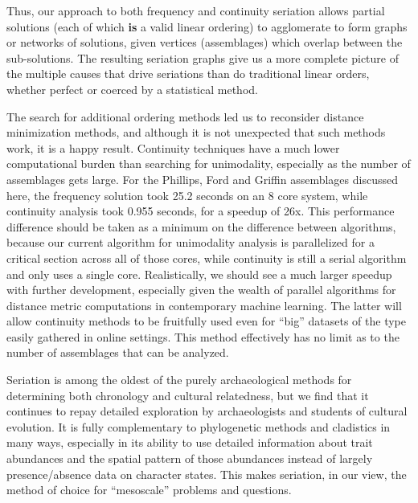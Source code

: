 Thus, our approach to both frequency and continuity seriation allows
partial solutions (each of which \textbf{is} a valid linear ordering) to
agglomerate to form graphs or networks of solutions, given vertices
(assemblages) which overlap between the sub-solutions. The resulting
seriation graphs give us a more complete picture of the multiple causes
that drive seriations than do traditional linear orders, whether perfect
or coerced by a statistical method.

The search for additional ordering methods led us to reconsider distance
minimization methods, and although it is not unexpected that such
methods work, it is a happy result. Continuity techniques have a much
lower computational burden than searching for unimodality, especially as
the number of assemblages gets large. For the Phillips, Ford and Griffin
assemblages discussed here, the frequency solution took 25.2 seconds on
an 8 core system, while continuity analysis took 0.955 seconds, for a
speedup of 26x. This performance difference should be taken as a minimum
on the difference between algorithms, because our current algorithm for
unimodality analysis is parallelized for a critical section across all
of those cores, while continuity is still a serial algorithm and only
uses a single core. Realistically, we should see a much larger speedup
with further development, especially given the wealth of parallel
algorithms for distance metric computations in contemporary machine
learning. The latter will allow continuity methods to be fruitfully used
even for ``big'' datasets of the type easily gathered in online
settings. This method effectively has no limit as to the number of
assemblages that can be analyzed.

Seriation is among the oldest of the purely archaeological methods for
determining both chronology and cultural relatedness, but we find that
it continues to repay detailed exploration by archaeologists and
students of cultural evolution. It is fully complementary to
phylogenetic methods and cladistics in many ways, especially in its
ability to use detailed information about trait abundances and the
spatial pattern of those abundances instead of largely presence/absence
data on character states. This makes seriation, in our view, the method
of choice for ``mesoscale'' problems and questions.


